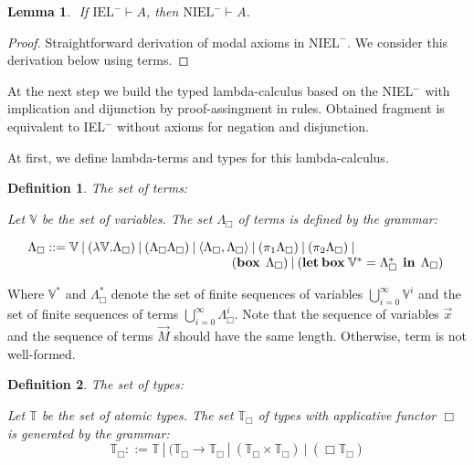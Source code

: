 \documentclass[a4paper]{article}
\newtheorem{lemma}{Lemma}
\newtheorem{defin}{Definition}
\begin{document}
\begin{lemma}
  $ $
  If $\text{IEL}^{-} \vdash A$, then $\text{NIEL}^{-} \vdash A$.
\end{lemma}

\begin{proof}
  Straightforward derivation of modal axioms in $\text{NIEL}^{-}$. We consider this derivation below using terms.
\end{proof}

  \vspace{\baselineskip}

  At the next step we build the typed lambda-calculus based on the NIEL$^{-}$ with implication and dijunction
by proof-assingment in rules. Obtained fragment is equivalent to IEL$^{-}$ without axioms for negation and disjunction.

  At first, we define lambda-terms and types for this lambda-calculus.

  \vspace{\baselineskip}

  \begin{defin} The set of terms:

  Let $\mathbb{V}$ be the set of variables. The set $\Lambda_{\Box}$ of terms is defined by the grammar:

$\begin{array}{lll}
& \Lambda_{\Box} ::= \mathbb{V} \: | \:  (\lambda \mathbb{V}.\Lambda_{\Box}) \: | \: (\Lambda_{\Box} \Lambda_{\Box}) \: | \: \langle \Lambda_{\Box} , \Lambda_{\Box} \rangle \: | \: (\pi_1 \Lambda_{\Box}) \: | \: (\pi_2 \Lambda_{\Box}) \: | & \\
& \quad\quad\quad\quad\quad\quad\quad\quad\quad\quad\quad\quad\quad\quad\quad\quad ({\bf box \: } \:\Lambda_{\Box}) \: | \: ({\bf let \: box \:} \mathbb{V}^{*} = \Lambda_{\Box}^{*} \:\: {\bf in} \:\: \Lambda_{\Box})
\end{array}$

  \end{defin}

Where $\mathbb{V}^{*}$ and $\Lambda_{\Box}^{*}$ denote the set of finite sequences of variables $\bigcup \limits_{i=0}^{\infty} \mathbb{V}^i$
and the set of finite sequences of terms $\bigcup \limits_{i = 0}^{\infty} \Lambda_{\Box}^i $. Note that the sequence of variables $\vec{x}$ and the sequence of terms $\vec{M}$ should have the same length.
Otherwise, term is not well-formed.

  \begin{defin} The set of types:

  Let $\mathbb{T}$ be the set of atomic types. The set $\mathbb{T}_{\Box}$ of types with applicative
  functor $\Box$ is generated by the grammar:
  \begin{equation}
    \mathbb{T}_{\Box} ::= \mathbb{T} \: | \: (\mathbb{T}_{\Box} \to \mathbb{T}_{\Box} \: |
    \: (\mathbb{T}_{\Box} \times \mathbb{T}_{\Box}) \: | \: (\Box \mathbb{T}_{\Box})
  \end{equation}
  \end{defin}
\end{document}
